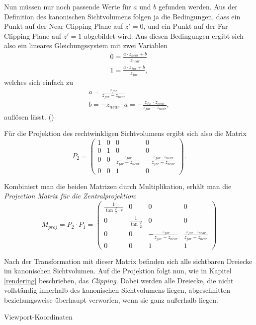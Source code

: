 Nun müssen nur noch passende Werte für $a$ und $b$ gefunden werden. Aus der Definition des kanonischen Sichtvolumens folgen ja die Bedingungen, dass ein Punkt auf der Near Clipping Plane auf $z'=0$, und ein Punkt auf der Far Clipping Plane auf $z'=1$ abgebildet wird. Aus diesen Bedingungen ergibt sich also ein lineares Gleichungssystem mit zwei Variablen
\begin{equation}
\begin{split}
 0 = \frac{a \cdot z_{near} + b}{z_{near}} \\
 1 = \frac{a \cdot z_{far} + b}{z_{far}},
\end{split}
\end{equation}
welches sich einfach zu
\begin{equation}
\begin{split}
 a = \frac{z_{far}}{z_{far}-z_{near}} \\
 b = -z_{near} \cdot a = -\frac{z_{far} \cdot z_{near}}{z_{far}-z_{near}},
\end{split} 
\end{equation}
auflösen lässt. (\vgl \citep{perspectiveprojectionmatrix})

Für die Projektion des rechtwinkligen Sichtvolumens ergibt sich also die Matrix
\begin{equation}
 P_2 = \begin{pmatrix}
  1 & 0 & 0 & 0 \\
  0 & 1 & 0 & 0 \\
  0 & 0 & \frac{z_{far}}{z_{far}-z_{near}} & -\frac{z_{far} \cdot z_{near}}{z_{far}-z_{near}} \\
  0 & 0 & 1 & 0
 \end{pmatrix}.
\end{equation}

Kombiniert man die beiden Matrizen durch Multiplikation, erhält man die \emph{Projection Matrix für die Zentralprojektion}:
\begin{equation}
 M_{proj} = P_2 \cdot P_1 = 
 \begin{pmatrix}
  \frac{1}{\tan\frac{\varphi}{2} \cdot r} & 0 & 0 & 0 \\
  0 & \frac{1}{\tan\frac{\varphi}{2}} & 0 & 0 \\
  0 & 0 & -\frac{z_{far}}{z_{far}-z_{near}} & \frac{z_{far} \cdot z_{near}}{z_{far}-z_{near}} \\
  0 & 0 & 1 & 1
 \end{pmatrix}
\end{equation} 

Nach der Transformation mit dieser Matrix befinden sich alle sichtbaren Dreiecke im kanonischen Sichtvolumen. Auf die Projektion folgt nun, wie in Kapitel \ref{rendering} beschrieben, das \emph{Clipping}. Dabei werden alle Dreiecke, die nicht vollständig innerhalb des kanonischen Sichtvolumens liegen, abgeschnitten beziehungsweise überhaupt verworfen, wenn sie ganz außerhalb liegen.

Viewport-Koordinaten